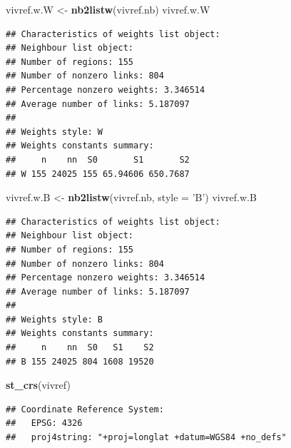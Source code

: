 \documentclass[11pt,]{article}
\newenvironment{Shaded}{\begin{snugshade}}{\end{snugshade}}
\newcommand{\KeywordTok}[1]{\textcolor[rgb]{0.13,0.29,0.53}{\textbf{#1}}}
\newcommand{\DataTypeTok}[1]{\textcolor[rgb]{0.13,0.29,0.53}{#1}}
\newcommand{\StringTok}[1]{\textcolor[rgb]{0.31,0.60,0.02}{#1}}
\newcommand{\NormalTok}[1]{#1}
\begin{document}
\begin{Shaded}
\begin{Highlighting}[]
\NormalTok{vivref.w.W  <-}\StringTok{ }\KeywordTok{nb2listw}\NormalTok{(vivref.nb)}
\NormalTok{vivref.w.W}
\end{Highlighting}
\end{Shaded}

\begin{verbatim}
## Characteristics of weights list object:
## Neighbour list object:
## Number of regions: 155 
## Number of nonzero links: 804 
## Percentage nonzero weights: 3.346514 
## Average number of links: 5.187097 
## 
## Weights style: W 
## Weights constants summary:
##     n    nn  S0       S1       S2
## W 155 24025 155 65.94606 650.7687
\end{verbatim}

\begin{Shaded}
\begin{Highlighting}[]
\NormalTok{vivref.w.B <-}\StringTok{ }\KeywordTok{nb2listw}\NormalTok{(vivref.nb, }\DataTypeTok{style =} \StringTok{'B'}\NormalTok{)}
\NormalTok{vivref.w.B }
\end{Highlighting}
\end{Shaded}

\begin{verbatim}
## Characteristics of weights list object:
## Neighbour list object:
## Number of regions: 155 
## Number of nonzero links: 804 
## Percentage nonzero weights: 3.346514 
## Average number of links: 5.187097 
## 
## Weights style: B 
## Weights constants summary:
##     n    nn  S0   S1    S2
## B 155 24025 804 1608 19520
\end{verbatim}

\begin{Shaded}
\begin{Highlighting}[]
\KeywordTok{st_crs}\NormalTok{(vivref)}
\end{Highlighting}
\end{Shaded}

\begin{verbatim}
## Coordinate Reference System:
##   EPSG: 4326 
##   proj4string: "+proj=longlat +datum=WGS84 +no_defs"
\end{verbatim}
\end{document}
